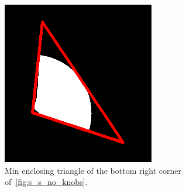 \documentclass{article}
\begin{document}
\begin{figure}\ContinuedFloat
  \begin{subfigure}{0.3\textwidth}
    \centering
    \includegraphics[width=\linewidth]{pictures/find_corners_min_enclosing_triangle.png}
    \caption{Min enclosing triangle of the bottom right corner of~\ref{fig:s_s_no_knobs}.}
    \label{fig:s_s_min_enc_triangle}
  \end{subfigure}
  \hfill
  \begin{subfigure}{0.3\textwidth}
    \centering

\end{subfigure}
\end{figure}
\end{document}

